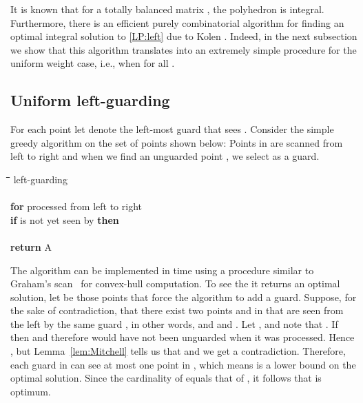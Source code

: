 \documentclass[11pt]{article}
\newenvironment{code}{\noindent \begin{tabbing}\hspace{1em}\=\hspace{1em}\=\hspace{1em}\=\hspace{1em}\=\hspace{1em}\=\hspace{1em}\=\hspace{1em}\=\hspace{1em}\=\hspace{1em}\=\hspace{1em}\=\kill}{\end{tabbing}}
\begin{document}
It is known that for a totally balanced matrix , the
polyhedron  is integral. Furthermore, there is an
efficient purely combinatorial algorithm for finding an optimal integral
solution to \eqref{LP:left} due to Kolen \cite{thesis/Kolen82}. Indeed, in the
next subsection we show that this algorithm translates into an extremely
simple procedure for the uniform weight case, i.e., when  for all .

\subsection{Uniform left-guarding}

For each point  let  denote the left-most guard that
sees . Consider the simple greedy algorithm on the set of points  shown
below: Points in  are scanned from left to right
and when we find an unguarded point , we select  as a guard.

\begin{center}
  \begin{minipage}{5em}
    \begin{code}
      {\sc left-guarding}  \\
       \\
      {\bf for}  processed from left to right \\
      \>  {\bf if}  is not yet seen by  {\bf then} \\
      \> \>  \\
      {\bf return} A
    \end{code}
  \end{minipage}
\end{center}

The algorithm can be implemented in  time using a procedure
similar to Graham's scan~\cite{journals/ipl/Graham72} for convex-hull
computation. To see the it returns an optimal solution, let  be
those points that force the algorithm to add a guard. Suppose, for the sake of
contradiction, that there exist two points  and  in  that are seen
from the left by the same guard , in other words,  and  and . Let , and note that . If  then  and therefore  would have not been
unguarded when it was processed. Hence , but Lemma~\ref{lem:Mitchell}
tells us that  and we get a contradiction. Therefore, each guard
in  can see at most one point in , which means  is a lower bound on
the optimal solution. Since the cardinality of  equals that of , it
follows that  is optimum.
\end{document}

